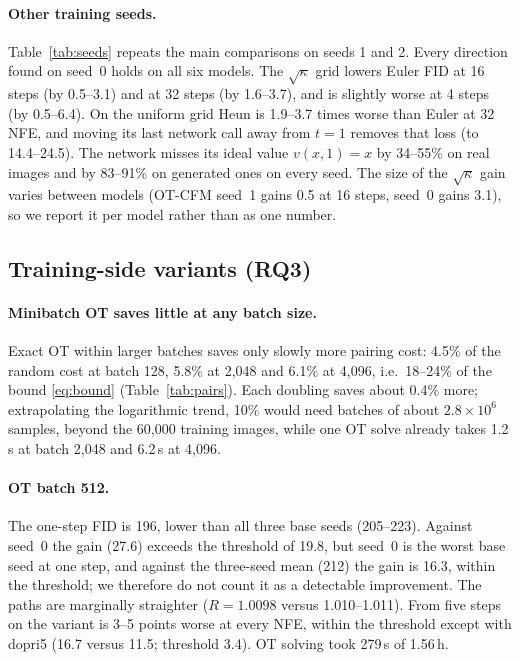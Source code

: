 
\paragraph{Other training seeds.} Table~\ref{tab:seeds} repeats the main comparisons on seeds 1 and 2. Every direction found on seed~0 holds on all six models. The $\sqrt\kappa$ grid lowers Euler FID at 16 steps (by 0.5--3.1) and at 32 steps (by 1.6--3.7), and is slightly worse at 4 steps (by 0.5--6.4). On the uniform grid Heun is 1.9--3.7 times worse than Euler at 32 NFE, and moving its last network call away from $t=1$ removes that loss (to 14.4--24.5). The network misses its ideal value $v(x,1)=x$ by 34--55\% on real images and by 83--91\% on generated ones on every seed. The size of the $\sqrt\kappa$ gain varies between models (OT-CFM seed~1 gains 0.5 at 16 steps, seed~0 gains 3.1), so we report it per model rather than as one number. %

\subsection{Training-side variants (RQ3)}\label{app:c35}

\paragraph{Minibatch OT saves little at any batch size.} Exact OT within larger batches saves only slowly more pairing cost: 4.5\% of the random cost at batch 128, 5.8\% at 2,048 and 6.1\% at 4,096, i.e.\ 18--24\% of the bound \eqref{eq:bound} (Table~\ref{tab:pairs}). Each doubling saves about 0.4\% more; extrapolating the logarithmic trend, 10\% would need batches of about $2.8\times10^6$ samples, beyond the 60,000 training images, while one OT solve already takes 1.2\,s at batch 2,048 and 6.2\,s at 4,096. %
\paragraph{OT batch 512.} The one-step FID is 196, lower than all three base seeds (205--223). Against seed~0 the gain (27.6) exceeds the threshold of 19.8, but seed~0 is the worst base seed at one step, and against the three-seed mean (212) the gain is 16.3, within the threshold; we therefore do not count it as a detectable improvement. The paths are marginally straighter ($R=1.0098$ versus 1.010--1.011). From five steps on the variant is 3--5 points worse at every NFE, within the threshold except with dopri5 (16.7 versus 11.5; threshold 3.4). OT solving took 279\,s of 1.56\,h. %
